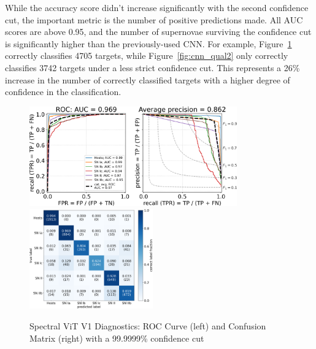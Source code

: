 While the accuracy score didn't increase significantly with the second confidence cut, 
the important metric is the number of positive predictions made. All AUC scores 
are above 0.95, and the number of supernovae surviving the confidence cut is significantly higher than the previously-used CNN. For example, Figure~\ref{fig:v1_999999_qual} correctly 
classifies 4705 targets, while Figure~\ref{fig:cnn_qual2} only correctly classifies 
3742 targets under a less strict confidence cut. This represents a 26\% increase in the
number of correctly classified targets with a higher degree of confidence in the classification.

\begin{figure}
    \centering
    \includegraphics[height=4.3cm]{figures/v1_real/vit_model_V1_original_redoroc999999_e31.png}
    \quad
    \includegraphics[height=4.3cm]{figures/v1_real/vit_model_V1_original_redocm999999_e31.png}
    \caption[Spectral ViT V1 Diagnostics: 99.9999\% Cut]{Spectral ViT V1 Diagnostics: ROC Curve (left) and Confusion Matrix (right) with a 99.9999\% confidence
    cut \label{fig:v1_999999_qual}}
\end{figure}


